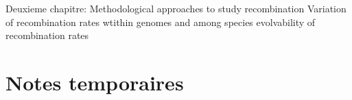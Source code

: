 Deuxieme chapitre:
Methodological approaches to study recombination
Variation of recombination rates wtithin genomes and among species
evolvability of recombination rates



\section*{Notes temporaires}


%





